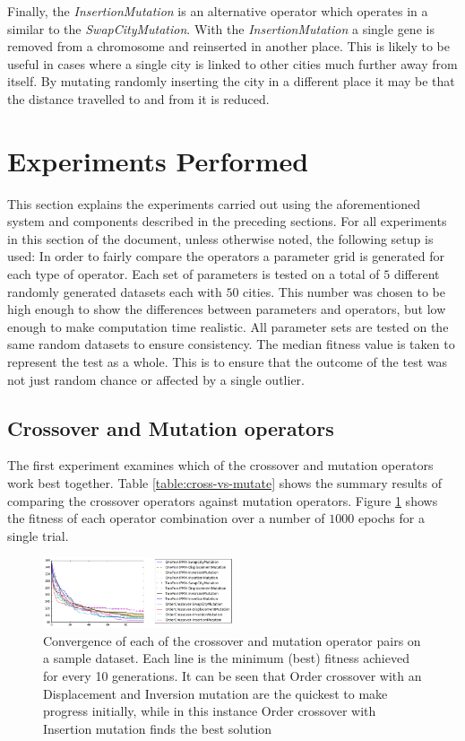 \documentclass[journal]{IEEEtran}
\begin{document}
Finally, the \textit{InsertionMutation} is an alternative operator which operates in a similar to the \textit{SwapCityMutation}. With the \textit{InsertionMutation} a single gene is removed from a chromosome and reinserted in another place. This is likely to be useful in cases where a single city is linked to other cities much further away from itself. By mutating randomly inserting the city in a different place it may be that the distance travelled to and from it is reduced.

\section{Experiments Performed}
\label{sec:experiments}
This section explains the experiments carried out using the aforementioned system and components described in the preceding sections. For all experiments in this section of the document, unless otherwise noted, the following setup is used: In order to fairly compare the operators a parameter grid is generated for each type of operator. Each set of parameters is tested on a total of $5$ different randomly generated datasets each with $50$ cities. This number was chosen to be high enough to show the differences between parameters and operators, but low enough to make computation time realistic. All parameter sets are tested on the same random datasets to ensure consistency. The median fitness value is taken to represent the test as a whole. This is to ensure that the outcome of the test was not just random chance or affected by a single outlier. 

\subsection{Crossover and Mutation operators}
\label{subsec:cross-vs-mutate-operators}
The first experiment examines which of the crossover and mutation operators work best together. Table \ref{table:cross-vs-mutate} shows the summary results of comparing the crossover operators against mutation operators. Figure \ref{fig:cross-vs-mutate} shows the fitness of each operator combination over a number of $1000$ epochs for a single trial.

\begin{figure}[H]
\centering
\includegraphics[width=0.5\textwidth]{figures/cross_vs_mutate_convergence.png}
\caption{Convergence of each of the crossover and mutation operator pairs on a sample dataset. Each line is the minimum (best) fitness achieved for every 10 generations. It can be seen that Order crossover with an Displacement and Inversion mutation are the quickest to make progress initially, while in this instance Order crossover with Insertion mutation finds the best solution}
\label{fig:cross-vs-mutate}
\end{figure}
\end{document}
